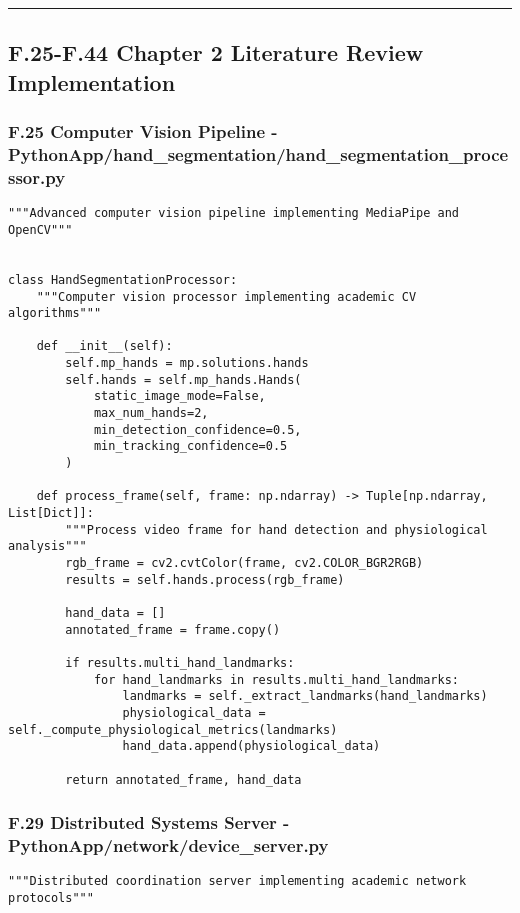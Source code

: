 \documentclass[12pt,a4paper]{report}
\begin{document}
{{\hrule

\subsection{F.25-F.44 Chapter 2 Literature Review Implementation}

\subsubsection{F.25 Computer Vision Pipeline - PythonApp/hand_segmentation/hand_segmentation_processor.py}

\begin{verbatim}
"""Advanced computer vision pipeline implementing MediaPipe and OpenCV"""


class HandSegmentationProcessor:
    """Computer vision processor implementing academic CV algorithms"""

    def __init__(self):
        self.mp_hands = mp.solutions.hands
        self.hands = self.mp_hands.Hands(
            static_image_mode=False,
            max_num_hands=2,
            min_detection_confidence=0.5,
            min_tracking_confidence=0.5
        )

    def process_frame(self, frame: np.ndarray) -> Tuple[np.ndarray, List[Dict]]:
        """Process video frame for hand detection and physiological analysis"""
        rgb_frame = cv2.cvtColor(frame, cv2.COLOR_BGR2RGB)
        results = self.hands.process(rgb_frame)

        hand_data = []
        annotated_frame = frame.copy()

        if results.multi_hand_landmarks:
            for hand_landmarks in results.multi_hand_landmarks:
                landmarks = self._extract_landmarks(hand_landmarks)
                physiological_data = self._compute_physiological_metrics(landmarks)
                hand_data.append(physiological_data)

        return annotated_frame, hand_data
\end{verbatim}

\subsubsection{F.29 Distributed Systems Server - PythonApp/network/device_server.py}

\begin{verbatim}
"""Distributed coordination server implementing academic network protocols"""



\end{verbatim}}}
\end{document}
